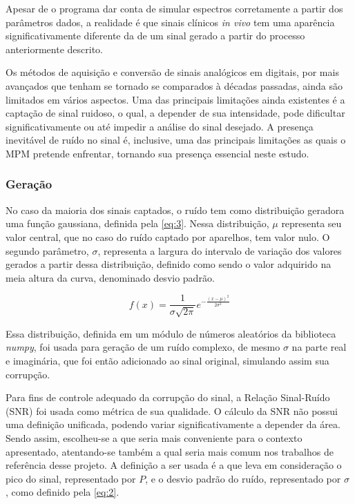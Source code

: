 \documentclass[
12pt,		
twoside, 
a4paper,
chapter=TITLE,
english,			
brazil]{USPSC-classe/USPSC}
\begin{document}
Apesar de o programa dar conta de simular espectros corretamente a partir dos parâmetros dados, a realidade é que sinais clínicos \textit{in vivo} tem uma aparência significativamente 
diferente da de um sinal gerado a partir do processo anteriormente descrito. 

Os métodos de aquisição e conversão de sinais analógicos em digitais, por mais avançados que tenham se tornado se comparados à décadas passadas, ainda são limitados em vários aspectos. Uma das principais 
limitações ainda existentes é a captação de sinal ruidoso, o qual, a depender de sua intensidade, pode dificultar significativamente ou até impedir a análise do sinal desejado. A presença 
inevitável de ruído no sinal é, inclusive, uma das principais limitações as quais o MPM pretende enfrentar, tornando sua presença essencial neste estudo. 

\subsubsection{Geração}

No caso da maioria dos sinais captados, o ruído tem como distribuição geradora uma função gaussiana, definida pela \autoref{eq:3}. Nessa distribuição, $\mu$ representa seu valor central, 
que no caso do ruído captado por aparelhos, tem valor nulo. O segundo parâmetro, $\sigma$, representa a largura do intervalo de variação dos valores gerados a partir dessa 
distribuição, definido como sendo o valor adquirido na meia altura da curva, denominado desvio padrão.


\begin{equation} \label{eq:3}
    f(x) = \frac{1}{\sigma \sqrt{2\pi}}e^{-\frac{(x - \mu)^2}{2\sigma ^2}}
\end{equation}

Essa distribuição, definida em um módulo de números aleatórios da biblioteca \textit{numpy}, foi usada para geração de um ruído complexo, de mesmo $\sigma$ na parte real e imaginária, que foi então adicionado ao sinal original, simulando assim sua
corrupção.

Para fins de controle adequado da corrupção do sinal, a Relação Sinal-Ruído (SNR) foi usada como métrica de sua qualidade. O cálculo da SNR não possui uma definição unificada, podendo variar significativamente a depender da área. Sendo assim, 
escolheu-se a que seria mais conveniente para o contexto apresentado, atentando-se também a qual seria mais comum nos trabalhos de referência desse projeto. A definição a ser usada é a que 
leva em consideração o pico do sinal, representado por $P$, e o desvio padrão do ruído, representado por $\sigma$ \cite{}, como definido pela \autoref{eq:2}.  
\end{document}
